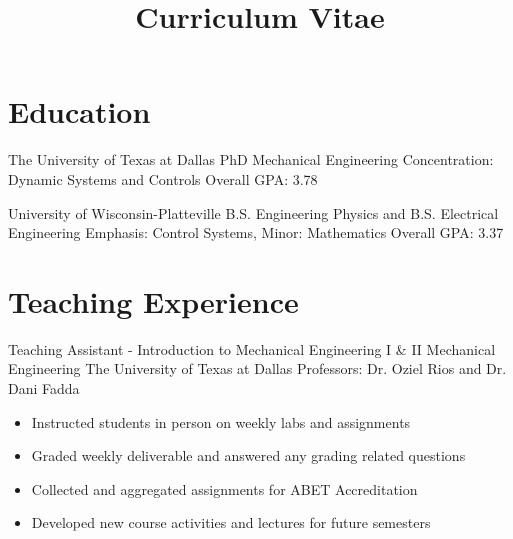 \documentclass[11pt,letterpaper,roman]{moderncv} %
\title{Curriculum Vitae}
\begin{document}

\makecvtitle %

\vspace{- 1 cm}

\section{Education}

{The University of Texas at Dallas}
{PhD Mechanical Engineering}{}
{Concentration: Dynamic Systems and Controls} 
{Overall GPA: 3.78}

{University of Wisconsin-Platteville}
{B.S. Engineering Physics and  B.S. Electrical Engineering}{}
{Emphasis: Control Systems, Minor: Mathematics} 
{Overall GPA: 3.37}



\section{Teaching Experience}

{Teaching Assistant - Introduction to Mechanical Engineering I \& II}
{Mechanical Engineering}
{The University of Texas at Dallas}
{Professors: Dr. Oziel Rios and Dr. Dani Fadda}
{\begin{itemize}
    \item Instructed students in person on weekly labs and assignments
    \item Graded weekly deliverable and answered any grading related questions
    \item Collected and aggregated assignments for ABET Accreditation
    \item Developed new course activities and lectures for future semesters
\end{itemize}}
\end{document}

